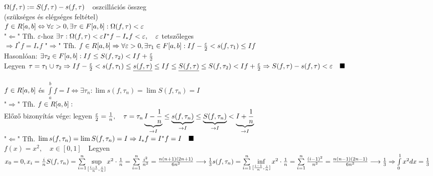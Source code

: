 \documentclass[a4paper,11pt]{article}
\begin{document}
 $\Omega(f,\tau):=S(f,\tau)-s(f,\tau)\quad$oszcillációs összeg\\[0.2cm]
\tetel (szükséges és elégséges feltétel)\\[0.2cm]
$f\in R[a,b]\Leftrightarrow\forall\varepsilon>0,\exists\tau\in F[a,b]:\Omega(f,\tau)<
\varepsilon$\\[0.2cm]
\biz "$\Leftarrow$" Tfh. $\varepsilon$-hoz $\exists\tau:\Omega(f,\tau)<\varepsilon
\\[0.2cm]I^*f-I_*f<\varepsilon,\quad\varepsilon$ tetszőleges\\[0.2cm]
$\Rightarrow I^*f=I_*f$\newpage
"$\Rightarrow$" Tfh. $f\in R[a,b]\Rightarrow\forall\varepsilon>0,\exists\tau_1\in F[a,b]
:If-\frac{\varepsilon}{2}<s(f,\tau_1)\leq If$\\[0.2cm]Hasonlóan:
$\exists\tau_2\in F[a,b]:If\leq S(f,\tau_2)<If+\frac{\varepsilon}{2}$\\[0.2cm]
Legyen $\tau=\tau_1\cup\tau_2\Rightarrow\\[0.2cm]If-\frac{\varepsilon}{2}<s(f,\tau_1)\leq
\underline{s(f,\tau)}\leq If\leq \underline{S(f,\tau)}\leq S(f,\tau_2)<If
+\frac{\varepsilon}{2}\\[0.3cm]\Rightarrow S(f,\tau)-s(f,\tau)<\varepsilon\quad\blacksquare$
\\[0.2cm]\tetel\\[0.2cm]$f\in R[a,b]$ és $\int\limits_{a}^{b}f=I\Leftrightarrow
\exists\tau_n:\lim s(f,\tau_n)=\lim S(f,\tau_n)=I$\\[0.2cm]\biz
"$\Rightarrow$" Tfh. $f\in R[a,b]:$\\[0.2cm]Előző bizonyítás vége:
legyen $\frac{\varepsilon}{2}=\frac{1}{n},\quad\tau=\tau_n\\[0.2cm]
\underbrace{I-\frac{1}{n}}_{\to I}\leq\underbrace{s(f,\tau_n)}_{\to I}\leq
\underbrace{S(f,\tau_n)}_{\to I}<\underbrace{I+\frac{1}{n}}_{\to I}$
\\[0.2cm]"$\Leftarrow$" Tfh. $\lim s(f,\tau_n)=\lim S(f,\tau_n)=I\Rightarrow
I_*f=I^*f=I\quad\blacksquare$\\[0.3cm]
\pl $f(x)=x^2,\quad x\in[0,1]\quad$Legyen $x_0=0,x_i=\frac{i}{n}\\[0.2cm]
S(f,\tau_n)=\sum\limits_{i=1}^{n}\sup\limits_{[\frac{i-1}{n},\frac{i}{n}]}x^2
\cdot\frac{1}{n}=\sum\limits_{i=1}^{n}\frac{i^2}{n^3}=
\frac{n(n+1)(2n+1)}{6n^3}\longrightarrow\frac{1}{3}\\[0.3cm]
s(f,\tau_n)=\sum\limits_{i=1}^{n}\inf\limits_{[\frac{i-1}{n},\frac{i}{n}]}x^2
\cdot\frac{1}{n}=\sum\limits_{i=1}^{n}\frac{(i-1)^2}{n^3}=
\frac{n(n-1)(2n-1)}{6n^3}\longrightarrow\frac{1}{3}\\[0.2cm]
\Rightarrow\int\limits_{0}^{1}x^2dx=\frac{1}{3}$\\[0.2cm]
\end{document}

